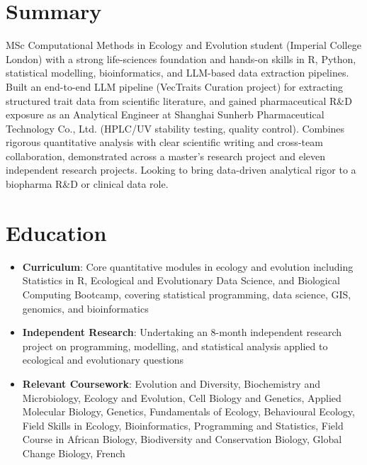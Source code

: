 \documentclass{my-resume}
\begin{document}


\section{Summary}
MSc Computational Methods in Ecology and Evolution student (Imperial College London) with a strong life-sciences foundation and hands-on skills in R, Python, statistical modelling, bioinformatics, and LLM-based data extraction pipelines. Built an end-to-end LLM pipeline (VecTraits Curation project) for extracting structured trait data from scientific literature, and gained pharmaceutical R\&D exposure as an Analytical Engineer at Shanghai Sunherb Pharmaceutical Technology Co., Ltd. (HPLC/UV stability testing, quality control). Combines rigorous quantitative analysis with clear scientific writing and cross-team collaboration, demonstrated across a master's research project and eleven independent research projects. Looking to bring data-driven analytical rigor to a biopharma R\&D or clinical data role.

\section{Education}
\begin{itemize}[parsep=0.2ex]
  \item \textbf{Curriculum}: Core quantitative modules in ecology and evolution including Statistics in R, Ecological and Evolutionary Data Science, and Biological Computing Bootcamp, covering statistical programming, data science, GIS, genomics, and bioinformatics
  \item \textbf{Independent Research}: Undertaking an 8-month independent research project on programming, modelling, and statistical analysis applied to ecological and evolutionary questions
\end{itemize}
\begin{itemize}[parsep=0.2ex]
  \item \textbf{Relevant Coursework}: Evolution and Diversity, Biochemistry and Microbiology, Ecology and Evolution, Cell Biology and Genetics, Applied Molecular Biology, Genetics, Fundamentals of Ecology, Behavioural Ecology, Field Skills in Ecology, Bioinformatics, Programming and Statistics, Field Course in African Biology, Biodiversity and Conservation Biology, Global Change Biology, French
\end{itemize}
\end{document}
